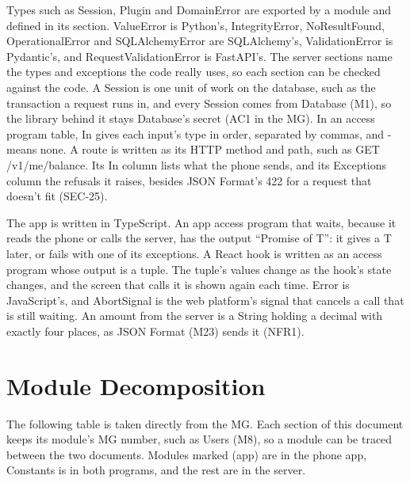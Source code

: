 \documentclass[12pt, titlepage]{article}
\begin{document}
Types such as Session, Plugin and DomainError are exported by a module and
defined in its section. ValueError is Python's, IntegrityError,
NoResultFound, OperationalError and SQLAlchemyError are SQLAlchemy's,
ValidationError is Pydantic's, and RequestValidationError is FastAPI's. The
server sections name the types and exceptions the code really uses, so each
section can be checked against the code. A Session is one unit of work on the
database, such as the transaction a request runs in, and every Session comes
from Database (M1), so the library behind it stays Database's secret (AC1 in
the MG). In
an access program table, In gives each input's type in order, separated by
commas, and - means none. A route is written as its HTTP method and path, such
as GET /v1/me/balance. Its In column lists what the phone
sends, and its Exceptions column the refusals it raises, besides JSON Format's 422
for a request that doesn't fit (SEC-25).

The app is written in TypeScript. An app access program that waits, because
it reads the phone or calls the server, has the output ``Promise of T'': it
gives a T later, or fails with one of its exceptions. A React hook is written
as an access program whose output is a tuple. The tuple's values change as the
hook's state changes, and the screen that calls it is shown again each time.
Error is JavaScript's, and AbortSignal is the web platform's signal that
cancels a call that is still waiting. An amount from the server is a String
holding a decimal with exactly four places, as JSON Format
(M23) sends it (NFR1).

\newpage

\section{Module Decomposition}

The following table is taken directly from the MG. Each section of this
document keeps its module's MG number, such as Users (M8), so a module can be
traced between the two documents. Modules marked (app) are in the phone app,
Constants is in both programs, and the rest are in the server.
\end{document}
